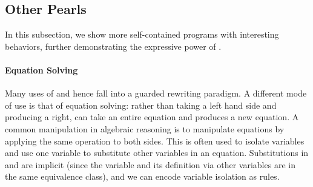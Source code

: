 \subsection{Other \egglog Pearls}\label{sec:other-pearls}

In this subsection,
 we show more self-contained programs with interesting behaviors,
 further demonstrating the expressive power of \egglog.

\paragraph{Equation Solving}
Many uses of \eqsat and hence \egglog fall into a guarded rewriting paradigm. A
different mode of use is that of equation solving: rather than
taking a left hand side and producing a right, \egglog can take an entire equation
and produces a new equation.
A common manipulation in algebraic reasoning is to
manipulate equations by applying the same operation to both sides. This is often
 used to isolate variables
 and use one variable to substitute other variables in an equation.
Substitutions in \egraphs and \egglog are implicit
 (since the variable and its definition via other variables are in the same equivalence class),
 and we can encode variable isolation as rules.

